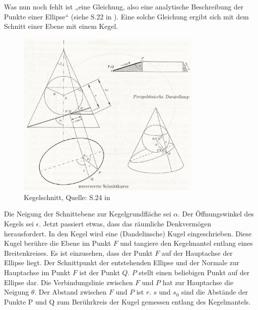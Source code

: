 Was nun noch fehlt ist „eine Gleichung, also eine analytische Beschreibung der Punkte einer Ellipse“ (siehe S.22 in \cite{Raumflugm}). Eine solche Gleichung ergibt sich mit dem Schnitt einer Ebene mit einem Kegel. 
\begin{figure}[h]                                                                           %
	\centering                                                                            	%
	\includegraphics[width=0.8\textwidth]{./images/keplers_law1.jpg}                        %
	\caption[Kegelschnitt]{Kegelschnitt, Quelle: S.24 in \cite{Raumflugm}}                  %
	\label{fig:kegelsch}                                                                    %
\end{figure}                                                                              	%
Die Neigung der Schnittebene zur Kegelgrundfläche sei \ensuremath{\alpha}. Der Öffnungswinkel des Kegels sei \ensuremath{\epsilon}. Jetzt passiert etwas, dass das räumliche Denkvermögen herausfordert. In den Kegel wird eine (Dandelinsche) Kugel eingeschrieben. Diese Kugel berühre die Ebene im Punkt \ensuremath{F} und tangiere den Kegelmantel entlang eines Breitenkreises. Es ist einzusehen, dass der Punkt \ensuremath{F} auf der Hauptachse der Ellipse liegt. Der Schnittpunkt der entstehenden Ellipse und der Normale zur Hauptachse im Punkt \ensuremath{F} ist der Punkt \ensuremath{Q}. \ensuremath{P} stellt einen beliebigen Punkt auf der Ellipse dar. Die Verbindungslinie zwischen \ensuremath{F} und \ensuremath{P} hat zur Hauptachse die Neigung \ensuremath{\theta}. Der Abstand zwischen \ensuremath{F} und \ensuremath{P} ist \ensuremath{r}. \ensuremath{s} und \ensuremath{s_0} sind die Abstände der Punkte P und Q zum Berührkreis der Kugel gemessen entlang des Kegelmantels. 
